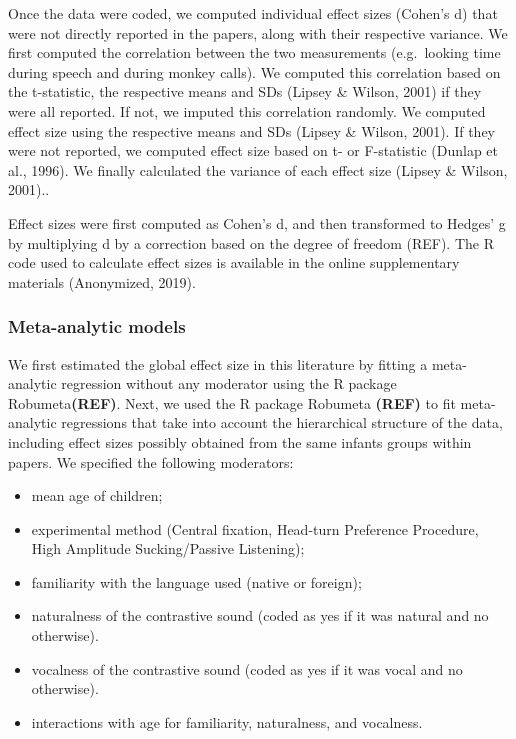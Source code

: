 \documentclass[]{apa6}
\providecommand{\tightlist}{%
  \setlength{\itemsep}{0pt}\setlength{\parskip}{0pt}}
\begin{document}
Once the data were coded, we computed individual effect sizes (Cohen's
d) that were not directly reported in the papers, along with their
respective variance. We first computed the correlation between the two
measurements (e.g.~looking time during speech and during monkey calls).
We computed this correlation based on the t-statistic, the respective
means and SDs (Lipsey \& Wilson, 2001) if they were all reported. If
not, we imputed this correlation randomly. We computed effect size using
the respective means and SDs (Lipsey \& Wilson, 2001). If they were not
reported, we computed effect size based on t- or F-statistic (Dunlap et
al., 1996). We finally calculated the variance of each effect size
(Lipsey \& Wilson, 2001)..

Effect sizes were first computed as Cohen's d, and then transformed to
Hedges' g by multiplying d by a correction based on the degree of
freedom (REF). The R code used to calculate effect sizes is available in
the online supplementary materials (Anonymized, 2019).

\subsubsection{Meta-analytic models}\label{meta-analytic-models}

We first estimated the global effect size in this literature by fitting
a meta-analytic regression without any moderator using the R package
Robumeta\textbf{(REF)}. Next, we used the R package Robumeta
\textbf{(REF)} to fit meta-analytic regressions that take into account
the hierarchical structure of the data, including effect sizes possibly
obtained from the same infants groups within papers. We specified the
following moderators:

\begin{itemize}
\tightlist
\item
  mean age of children;
\item
  experimental method (Central fixation, Head-turn Preference Procedure,
  High Amplitude Sucking/Passive Listening);
\item
  familiarity with the language used (native or foreign);
\item
  naturalness of the contrastive sound (coded as yes if it was natural
  and no otherwise).
\item
  vocalness of the contrastive sound (coded as yes if it was vocal and
  no otherwise).
\item
  interactions with age for familiarity, naturalness, and vocalness.
\end{itemize}
\end{document}
